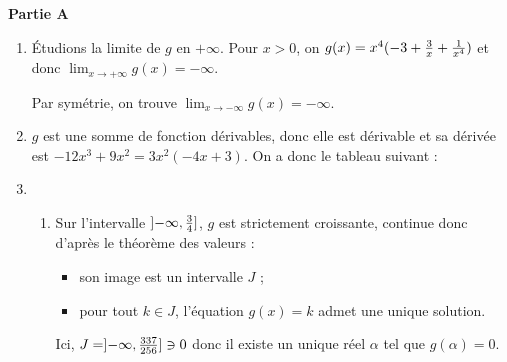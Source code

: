 \documentclass[12pt,a4paper,french]{article}
\begin{document}
\begin{solution}
\textbf{Partie A}

\begin{enumerate}
\item Étudions la limite de $g$ en $+\infty$. Pour $x > 0$, on $g(x) = x^4\brk*{-3 + \frac{3}{x} + \frac{1}{x^4}}$ et donc $\lim_{x\to +\infty}g(x) = -\infty$.

Par symétrie, on trouve $\lim_{x\to -\infty}g(x) = -\infty$.
\item $g$ est une somme de fonction dérivables, donc elle est dérivable et sa dérivée est $-12x^3 + 9x^2 = 3x^2(-4x + 3)$. On a donc le tableau suivant :
\begin{center}
\end{center}
\item \begin{enumerate}
\item Sur l'intervalle $\intv[l]*{-\infty}{\frac34}$, $g$ est strictement croissante, 
continue donc d'après le théorème des valeurs :
\begin{itemize}
\item son image est un intervalle $J$ ;
\item pour tout $k\in J$, l'équation $g(x) = k$ admet une unique solution.
\end{itemize}
Ici, $J = \intv[l]*{-\infty}{\frac{337}{256}} \ni 0$ donc il existe un unique réel 
$\alpha$ tel que $g(\alpha) = 0$.


\end{enumerate}
\end{enumerate}
\end{solution}
\end{document}
